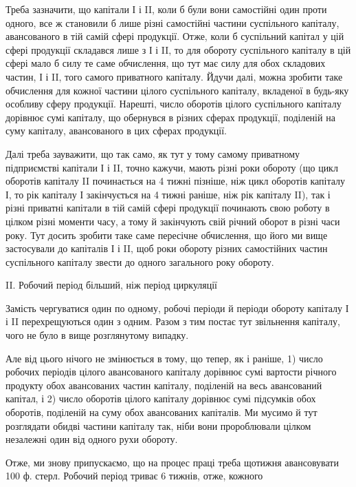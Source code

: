 Треба зазначити, що капітали І і II, коли б були вони самостійні
один проти одного, все ж становили б лише різні самостійні частини суспільного
капіталу, авансованого в тій самій сфері продукції. Отже, коли б
суспільний капітал у цій сфері продукції складався лише з І і II, то для
обороту суспільного капіталу в цій сфері мало б силу те саме обчислення,
що тут має силу для обох складових частин, І і II, того самого
приватного капіталу. Йдучи далі, можна зробити таке обчислення для
кожної частини цілого суспільного капіталу, вкладеної в будь-яку особливу
сферу продукції. Нарешті, число оборотів цілого суспільного капіталу
дорівнює сумі капіталу, що обернувся в різних сферах продукції,
поділеній на суму капіталу, авансованого в цих сферах продукції.

Далі треба зауважити, що так само, як тут у тому самому приватному
підприємстві капітали І і II, точно кажучи, мають різні роки обороту
(що цикл оборотів капіталу II починається на 4 тижні пізніше, ніж
цикл оборотів капіталу І, то рік капіталу І закінчується на 4 тижні
раніше, ніж рік капіталу II), так і різні приватні капітали в тій самій
сфері продукції починають свою роботу в цілком різні моменти часу,
а тому й закінчують свій річний оборот в різні часи року. Тут досить
зробити таке саме пересічне обчислення, що його ми вище застосували
до капіталів І і II, щоб роки обороту різних самостійних частин суспільного
капіталу звести до одного загального року обороту.

II. Робочий період більший, ніж період циркуляції

Замість чергуватися один по одному, робочі періоди й періоди обороту
капіталу І і II перехрещуються один з одним. Разом з тим постає
тут звільнення капіталу, чого не було в вище розглянутому випадку.

Але від цього нічого не змінюється в тому, що тепер, як і раніше,
1) число робочих періодів цілого авансованого капіталу дорівнює сумі
вартости річного продукту обох авансованих частин капіталу, поділеній
на весь авансований капітал, і 2) число оборотів цілого капіталу дорівнює
сумі підсумків обох оборотів, поділеній на суму обох авансованих
капіталів. Ми мусимо й тут розглядати обидві частини капіталу так, ніби
вони пророблювали цілком незалежні один від одного рухи обороту.

Отже, ми знову припускаємо, що на процес праці треба щотижня
авансовувати 100 ф. стерл. Робочий період триває 6 тижнів, отже, кожного
\parbreak{}  %
